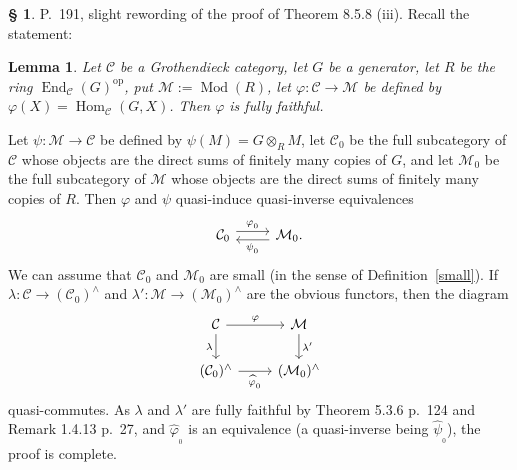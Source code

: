 \documentclass[12pt]{article}
\newtheorem{lem}[thm]{Lemma}
\theoremstyle{remark}
\theoremstyle{definition}
\newtheorem{cm}[thm]{\S}
\newcommand{\bc}{\begin{cm}}\newcommand{\ec}{\end{cm}}
\newcommand{\n}{\noindent}
\newcommand{\C}{\mathcal C}
\newcommand{\M}{\mathcal M}
\newcommand{\p}{\varphi}
\newcommand{\pf}{\n{\em Proof. }}
\DeclareMathOperator{\h}{Hom}
\DeclareMathOperator{\Mod}{Mod}
\DeclareMathOperator{\op}{op}
\begin{document}

\bc P.~191, slight rewording of the proof of Theorem 8.5.8 (iii). Recall the statement: 
%
\begin{lem}\label{858iii}
%
Let $\C$ be a Grothendieck category, let $G$ be a generator, let $R$ be the ring $\operatorname{End}_\C(G)^{\op}$, put $\M:=\Mod(R)$, let $\p:\C\to\M$ be defined by $\p(X)=\h_\C(G,X)$. Then $\p$ is fully faithful. 
%
\end{lem}
%
\pf Let $\psi:\M\to\C$ be defined by $\psi(M)=G\otimes_RM$, let $\C_0$ be the full subcategory of $\C$ whose objects are the direct sums of finitely many copies of $G$, and let $\M_0$ be the full subcategory of $\M$ whose objects are the direct sums of finitely many copies of $R$. Then $\p$ and $\psi$ quasi-induce quasi-inverse equivalences 
$$
\begin{tikzcd}
\C_0\ar[yshift=.7ex]{r}{\p_{{}_0}}&\M_0.\ar[yshift=-.7ex]{l}{\psi_{{}_0}}
\end{tikzcd}
$$ 
We can assume that $\C_0$ and $\M_0$ are small (in the sense of Definition~\ref{small}). If $\lambda:\C\to(\C_0)^\wedge$ and $\lambda':\M\to(\M_0)^\wedge$ are the obvious functors, then the diagram 
$$
\begin{tikzcd}
\C\ar{r}{\p}\ar{d}[swap]{\lambda}&\M\ar{d}{\lambda'}\\
(\C_0)^\wedge\ar{r}[swap]{\widehat\p_{{}_0}}&(\M_0)^\wedge
\end{tikzcd}
$$ 
quasi-commutes. As $\lambda$ and $\lambda'$ are fully faithful by Theorem 5.3.6 p.~124 and Remark 1.4.13 p.~27, and $\widehat\p_{{}_0}$ is an equivalence (a quasi-inverse being $\widehat\psi_{{}_0}$), the proof is complete.
\ec 

\end{document}
